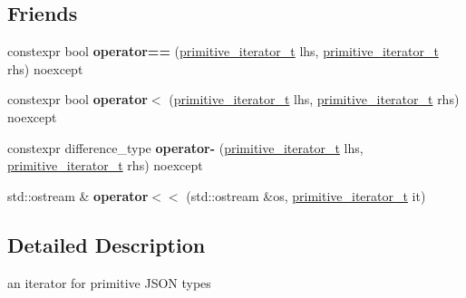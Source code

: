 \subsection*{Friends}
\begin{DoxyCompactItemize}
\item 
constexpr bool {\bfseries operator==} (\hyperlink{classnlohmann_1_1detail_1_1primitive__iterator__t}{primitive\+\_\+iterator\+\_\+t} lhs, \hyperlink{classnlohmann_1_1detail_1_1primitive__iterator__t}{primitive\+\_\+iterator\+\_\+t} rhs) noexcept\hypertarget{classnlohmann_1_1detail_1_1primitive__iterator__t_aae1e1e2ec0e229d1291d69de57d76bbe}{}\label{classnlohmann_1_1detail_1_1primitive__iterator__t_aae1e1e2ec0e229d1291d69de57d76bbe}

\item 
constexpr bool {\bfseries operator$<$} (\hyperlink{classnlohmann_1_1detail_1_1primitive__iterator__t}{primitive\+\_\+iterator\+\_\+t} lhs, \hyperlink{classnlohmann_1_1detail_1_1primitive__iterator__t}{primitive\+\_\+iterator\+\_\+t} rhs) noexcept\hypertarget{classnlohmann_1_1detail_1_1primitive__iterator__t_a901a95e6d73c9509d3dcde914f6c8a9d}{}\label{classnlohmann_1_1detail_1_1primitive__iterator__t_a901a95e6d73c9509d3dcde914f6c8a9d}

\item 
constexpr difference\+\_\+type {\bfseries operator-\/} (\hyperlink{classnlohmann_1_1detail_1_1primitive__iterator__t}{primitive\+\_\+iterator\+\_\+t} lhs, \hyperlink{classnlohmann_1_1detail_1_1primitive__iterator__t}{primitive\+\_\+iterator\+\_\+t} rhs) noexcept\hypertarget{classnlohmann_1_1detail_1_1primitive__iterator__t_ac6d902d6ec9a02dabed5452d3ae78f7e}{}\label{classnlohmann_1_1detail_1_1primitive__iterator__t_ac6d902d6ec9a02dabed5452d3ae78f7e}

\item 
std\+::ostream \& {\bfseries operator$<$$<$} (std\+::ostream \&os, \hyperlink{classnlohmann_1_1detail_1_1primitive__iterator__t}{primitive\+\_\+iterator\+\_\+t} it)\hypertarget{classnlohmann_1_1detail_1_1primitive__iterator__t_a653e8be3b4fb047e8b4460cd932f2b52}{}\label{classnlohmann_1_1detail_1_1primitive__iterator__t_a653e8be3b4fb047e8b4460cd932f2b52}

\end{DoxyCompactItemize}


\subsection{Detailed Description}
an iterator for primitive J\+S\+ON types 

